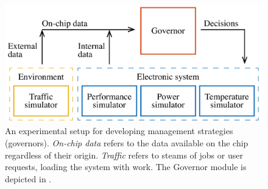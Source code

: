 \begin{figure}
  \centering
  \includegraphics[width=1.0\columnwidth]{include/assets/figures/developer.pdf}

  \caption{An experimental setup for developing management strategies
  (governors). \emph{On-chip data} refers to the data available on the chip
  regardless of their origin. \emph{Traffic} refers to steams of jobs or user
  requests, loading the system with work. The Governor module is depicted in
  .}

\end{figure}
